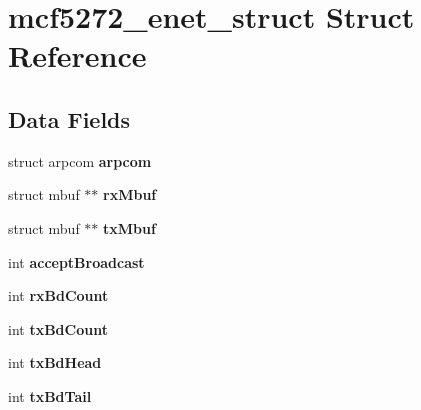 \hypertarget{structmcf5272__enet__struct}{}\section{mcf5272\+\_\+enet\+\_\+struct Struct Reference}
\label{structmcf5272__enet__struct}
\subsection*{Data Fields}
\begin{DoxyCompactItemize}
\item 
\mbox{\label{structmcf5272__enet__struct_a5e46a4cf13d5c6b3da857d66bc19ba28}} 
struct arpcom {\bfseries arpcom}
\item 
\mbox{\label{structmcf5272__enet__struct_a03420fcc5767cd4e0a94430549609c29}} 
struct mbuf $\ast$$\ast$ {\bfseries rx\+Mbuf}
\item 
\mbox{\label{structmcf5272__enet__struct_a18b07e23a47f690009f311b8239b9976}} 
struct mbuf $\ast$$\ast$ {\bfseries tx\+Mbuf}
\item 
\mbox{\label{structmcf5272__enet__struct_ae50a3d0e1024df8650997612786a6875}} 
int {\bfseries accept\+Broadcast}
\item 
\mbox{\label{structmcf5272__enet__struct_a776a7543c6f3fc66da62afa7d93f1a37}} 
int {\bfseries rx\+Bd\+Count}
\item 
\mbox{\label{structmcf5272__enet__struct_abf675a8797c66e7f437309b768fefb56}} 
int {\bfseries tx\+Bd\+Count}
\item 
\mbox{\label{structmcf5272__enet__struct_a24de802847997f78b18686357860a938}} 
int {\bfseries tx\+Bd\+Head}
\item 
\mbox{\label{structmcf5272__enet__struct_a459f6161a742257d45444501d4ddd4ab}} 
int {\bfseries tx\+Bd\+Tail}
\item 
\mbox{\label{structmcf5272__enet__struct_a2864cb7d666ed77f8025f755a27f9011}} 

\end{DoxyCompactItemize}
